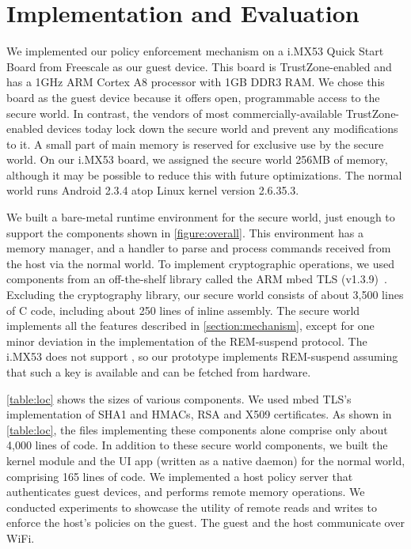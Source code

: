 \documentclass[pageno]{sig-alternate-05-2015}
\newcommand{\figref}[1]{\autoref{#1}}
\newcommand{\mysection}[1]{\section{#1}}
\newcommand{\sectref}[1]{\autoref{#1}}
\newcommand{\addtext}[2]{#2}
\begin{document}
% 

\mysection{Implementation and Evaluation}
\label{section:evaluation}

We implemented our policy enforcement mechanism on a i.MX53 Quick Start Board
from Freescale as our guest device. This board is TrustZone-enabled and has a
1GHz ARM Cortex A8 processor with 1GB DDR3 RAM. We chose this board as the
guest device because it offers open, programmable access to the secure world.
In contrast, the vendors of most commercially-available TrustZone-enabled
devices today lock down the secure world and prevent any modifications to it. A
small part of main memory is reserved for exclusive use by the secure world. On
our i.MX53 board, we assigned the secure world 256MB of memory, although it may
be possible to reduce this with future optimizations. The normal world runs
Android 2.3.4 atop Linux kernel version 2.6.35.3.

We built a bare-metal runtime environment for the secure world, just enough to
support the components shown in \figref{figure:overall}. This environment has a
memory manager, and a handler to parse and process commands received from the
host via the normal world. To implement cryptographic operations, we used
components from an off-the-shelf library called the ARM mbed TLS
(v1.3.9)~\cite{polarssl}.  Excluding the cryptography library, our secure world
consists of about 3,500 lines of C code, including about 250 lines of inline
assembly.  
%
\addtext{Task 6}{The secure world implements all the features described in
\sectref{section:mechanism}, except for one minor deviation in the
implementation of the REM-suspend protocol. The i.MX53 does not support \kdev,
so our prototype implements REM-suspend assuming that such a key is available
and can be fetched from hardware.}

\figref{table:loc} shows the sizes of various components.  We used mbed TLS's
implementation of SHA1 and HMACs, RSA and X509 certificates.  As shown in
\figref{table:loc}, the files implementing these components alone comprise only
about 4,000 lines of code. In addition to these secure world components, we
built the kernel module and the UI app (written as a native daemon) for the
normal world, comprising 165 lines of code.  We implemented a host policy
server that authenticates guest devices, and performs remote memory operations.
We conducted experiments to showcase the utility of remote reads and writes to
enforce the host's policies on the guest. The guest and the host communicate
over WiFi.
%
\end{document}
